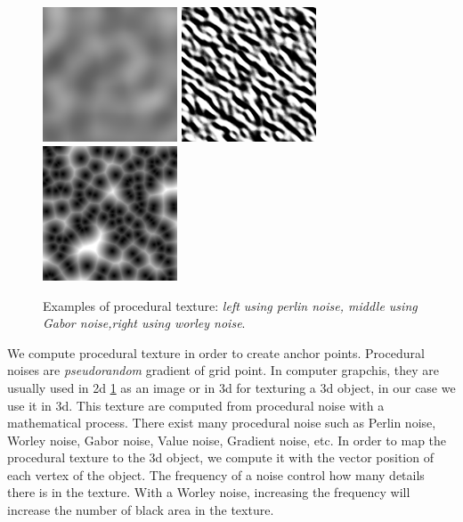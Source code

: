 \begin{figure}
    \begin{center}
    \includegraphics[width=40mm, height=40mm]{images/PerlinNoise2d.png}
    \includegraphics[width=40mm, height=40mm]{images/GaborNoise2d.png}
    \includegraphics[width=40mm, height=40mm]{images/WorleyNoise2d.jpg}
    \end{center}
    \caption{Examples of procedural texture: \textit{left using perlin noise, middle using Gabor noise,right using worley noise}.}
    \label{procedural_texture}
\end{figure}


We compute procedural texture in order to create anchor points. Procedural noises are \textit{pseudorandom} gradient of grid point. In computer grapchis, they are usually used in 2d \ref{procedural_texture} as an image or in 3d for texturing a 3d object, in our case we use it in 3d. This texture are computed from procedural noise with a mathematical process. There exist many procedural noise such as Perlin noise, Worley noise, Gabor noise, Value noise, Gradient noise, etc. In order to map the procedural texture to the 3d object, we compute it with the vector position of each vertex of the object. The frequency of a noise control how many details there is in the texture. With a Worley noise, increasing the frequency will increase the number of black area in the texture.


